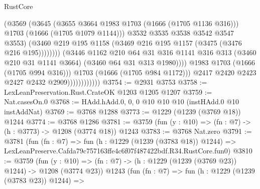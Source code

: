 \begin{lexlean}{RustCore}
\begin{coremodule}
                                            (@3569
                                              (@3645
                                                (@3655 @3664 @1983 @1703 (@1666 (@1705 @1136 @316)))
                                                @1703
                                                (@1666 (@1705 @1079 @1144)))
                                              @3532
                                              @3535
                                              @3538
                                              @3542
                                              @3547
                                              @3553)
                                            (@3460
                                              @219
                                              @195
                                              @1158
                                              (@3469 @216 @195 @1157 (@3475 (@3476 @216 @195))))))))
                                    (@3446
                                      @1162
                                      @210
                                      @64
                                      @31
                                      @316
                                      @1141
                                      @316
                                      @313
                                      (@3460 @210 @31 @1141 @3664)
                                      (@3460 @64 @31 @313 @1980))))
                                @1983
                                @1703
                                (@1666 (@1705 @994 @316)))
                              @1703
                              (@1666 (@1705 @984 @1172)))
                            @2417
                            @2420
                            @2423
                            @2427
                            @2432
                            @2909))))))))))))
@3754 := @2931 @3753
@3758 := LexLeanPreservation.Rust.CrateOK @1203 @1205 @1207
@3759 := Nat.casesOn.{0}
@3768 := HAdd.hAdd.{0, 0, 0} @10 @10 @10 (instHAdd.{0} @10 instAddNat)
@3769 := @3768 @1288
@3773 := @1229 (@1239 (@3769 @18)) @1244
@3774 := @3768 @1286
@3781 := @3759 (fun (y : @10) => (fn : @7) -> (h : @3773) -> @1208 (@3774 @18)) @1243
@3783 := @3768 Nat.zero
@3791 := @3781
    (fun (fn : @7) =>
    fun (h : @1229 (@1239 (@3783 @18)) @1244) =>
    LexLeanPreserve.Cafda79c757163ffe4c6f07f487422bdf.R34.RustCore.fun0)
@3810 := @3759
    (fun (y : @10) => (fn : @7) -> (h : @1229 (@1239 (@3769 @23)) @1244) -> @1208 (@3774 @23))
    @1243
    (fun (fn : @7) =>
    fun (h : @1229 (@1239 (@3783 @23)) @1244) =>

\end{coremodule}
\end{lexlean}
